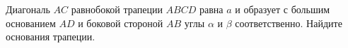 \begin{ex}
	\begin{condition}
		Диагональ \( AC  \) равнобокой трапеции \( ABCD  \) равна \( a \) и образует с большим основанием \( AD  \) и боковой стороной \( AB \)	углы \( \alpha \) и \( \beta \) соответственно. Найдите основания трапеции.
	\end{condition}
	\answer{\( \alpha(\cos\alpha\pm\sin\alpha\ctg(\alpha+\beta)) \)}
\end{ex}
